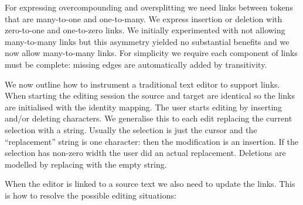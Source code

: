 \documentclass[10pt, a4paper]{article}
\newcommand{\dan}[1]{{\color{Fuchsia}{Dan: #1}}}
\begin{document}
For expressing overcompounding and oversplitting we need links between tokens
that are many-to-one and one-to-many. We express insertion or deletion with
zero-to-one and one-to-zero links. We initially experimented with not allowing
many-to-many links but this asymmetry yielded no substantial benefits
and we now allow many-to-many links.
For simplicity we require each component
of links must be complete: missing edges are automatically added by
transitivity.

We now outline how to instrument a traditional text editor to support links.
When starting the editing session the source and target are identical so the
links are initialised with the identity mapping. The user starts editing
by inserting and/or deleting characters.
We generalise this to each edit replacing the current selection with a
string. Usually the selection is just the cursor and the ``replacement'' string
is one character: then the modification is an insertion.
If the selection has non-zero width the user did an actual replacement.
Deletions are modelled by replacing with the empty string.

When the editor is linked to a source text we also need to update the links.
This is how to resolve the possible editing situations:

\dan{
Examples in ascii-art for now!
I intend to make proper (small) screenshots of these on Monday.
}
\end{document}
